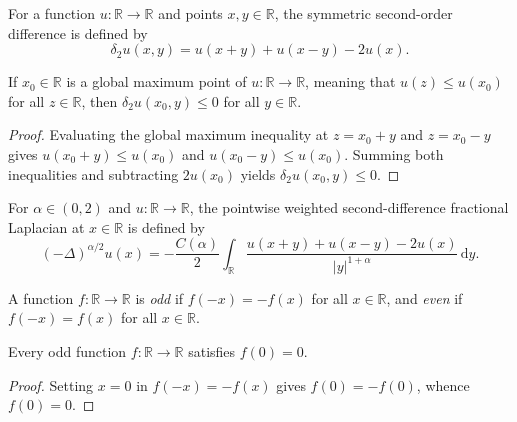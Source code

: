 \begin{definition}\label{def:second_diff}
\leanok
For a function $u : \mathbb{R} \to \mathbb{R}$ and points $x, y \in \mathbb{R}$, the symmetric second-order difference is defined by
\[
  \delta_2 u(x, y) = u(x + y) + u(x - y) - 2 u(x).
\]
\end{definition}

\begin{lemma}\label{lem:second_diff_nonpos}
\leanok
If $x_0 \in \mathbb{R}$ is a global maximum point of $u : \mathbb{R} \to \mathbb{R}$, meaning that $u(z) \le u(x_0)$ for all $z \in \mathbb{R}$, then $\delta_2 u(x_0, y) \le 0$ for all $y \in \mathbb{R}$.
\end{lemma}

\begin{proof}
\leanok
Evaluating the global maximum inequality at $z = x_0 + y$ and $z = x_0 - y$ gives $u(x_0 + y) \le u(x_0)$ and $u(x_0 - y) \le u(x_0)$. Summing both inequalities and subtracting $2 u(x_0)$ yields $\delta_2 u(x_0, y) \le 0$.
\end{proof}

\begin{definition}\label{def:frac_lap_second_diff}
\leanok
For $\alpha \in (0, 2)$ and $u : \mathbb{R} \to \mathbb{R}$, the pointwise weighted second-difference fractional Laplacian at $x \in \mathbb{R}$ is defined by
\[
  (-\Delta)^{\alpha/2} u(x) = -\frac{C(\alpha)}{2} \int_{\mathbb{R}} \frac{u(x + y) + u(x - y) - 2 u(x)}{\lvert y \rvert^{1 + \alpha}}\, \mathrm{d}y.
\]
\end{definition}

\begin{definition}\label{def:is_odd_even_func}
\leanok
A function $f : \mathbb{R} \to \mathbb{R}$ is \emph{odd} if $f(-x) = -f(x)$ for all $x \in \mathbb{R}$, and \emph{even} if $f(-x) = f(x)$ for all $x \in \mathbb{R}$.
\end{definition}

\begin{lemma}\label{lem:odd_func_map_zero}
\leanok
Every odd function $f : \mathbb{R} \to \mathbb{R}$ satisfies $f(0) = 0$.
\end{lemma}

\begin{proof}
\leanok
Setting $x = 0$ in $f(-x) = -f(x)$ gives $f(0) = -f(0)$, whence $f(0) = 0$.
\end{proof}

